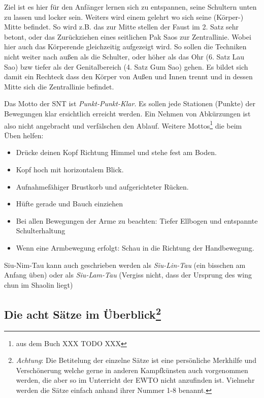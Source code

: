 Ziel ist es hier f\"ur den Anf\"anger lernen sich zu entspannen, seine Schultern unten zu lassen und locker sein. Weiters wird einem gelehrt wo sich seine (K\"orper-) Mitte befindet. So wird z.B. das zur Mitte stellen der Faust im 2. Satz sehr betont, oder das Zur\"uckziehen eines seitlichen Pak Saos zur Zentrallinie. Wobei hier auch das K\"orperende gleichzeitig aufgezeigt wird. So sollen die Techniken nicht weiter nach au{\ss}en als die Schulter, oder h\"oher als das Ohr (6. Satz Lau Sao) bzw tiefer als der Genitalbereich (4. Satz Gum Sao) gehen. Es bildet sich damit ein Rechteck dass den K\"orper von Au{\ss}en und Innen trennt und in dessen Mitte sich die Zentrallinie befindet.

Das Motto der SNT ist \textit{Punkt-Punkt-Klar}. Es sollen jede Stationen (Punkte) der Bewegungen klar ersichtlich erreicht werden. Ein Nehmen von Abk\"urzungen ist also nicht angebracht und verf\"alschen den Ablauf. Weitere Mottos\footnote{aus dem Buch XXX TODO XXX} die beim \"Uben helfen:

\begin{itemize}
	\item Dr\"ucke deinen Kopf Richtung Himmel und stehe fest am Boden.
	\item Kopf hoch mit horizontalem Blick.
	\item Aufnahmef\"ahiger Brustkorb und aufgerichteter R\"ucken.
	\item H\"ufte gerade und Bauch einziehen
	\item Bei allen Bewegungen der Arme zu beachten: Tiefer Ellbogen und entspannte Schulterhaltung
	\item Wenn eine Armbewegung erfolgt: Schau in die Richtung der Handbewegung.
\end{itemize}

\begin{WTCommonBegriff}
	Siu-Nim-Tau kann auch geschrieben werden als \textit{Siu-Lin-Tau} (ein bisschen am Anfang \"uben) oder als \textit{Siu-Lam-Tau} (Vergiss nicht, dass der Ursprung des wing chun im Shaolin liegt)
\end{WTCommonBegriff}

\subsection*{Die acht S\"atze im \"Uberblick\footnote{\textit{Achtung}: Die Betitelung der einzelne S\"atze ist eine pers\"onliche Merkhilfe und Versch\"onerung welche gerne in anderen Kampfk\"unsten auch vorgenommen werden, die aber so im Unterricht der EWTO nicht anzufinden ist. Vielmehr werden die S\"atze einfach anhand ihrer Nummer 1-8 benannt.}}

